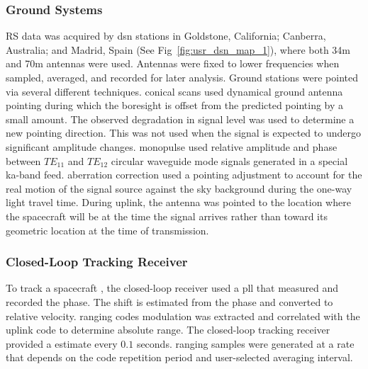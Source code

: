 \documentclass[crop=false,class=article,oneside]{standalone}
\begin{document}
        \subsubsection{\footnotesize{Ground Systems}}
            \label{subsubsec:usr_ground_sys}
            RS data was acquired by \gls{dsn} stations in
            Goldstone, California; Canberra, Australia;
            and Madrid, Spain
            (See Fig~\ref{fig:usr_dsn_map_1}),
            where both 34m and 70m antennas were used.
            Antennas were fixed to lower frequencies when
            sampled, averaged, and recorded for later
            analysis. Ground stations were pointed via
            several different techniques. \Glspl{conical scan}
            used dynamical ground antenna pointing during
            which the boresight is offset from the predicted
            pointing by a small amount. The observed
            degradation in signal level was used to determine
            a new pointing direction. This was not used when
            the signal is expected to undergo significant
            amplitude changes. \Gls{monopulse} used relative
            amplitude and phase between $TE_{11}$ and
            $TE_{12}$ circular \gls{waveguide} mode signals
            generated in a special \gls{ka-band} feed.
            \Gls{aberration correction} used a pointing
            adjustment to account for the real motion of
            the signal source against the sky background
            during the one-way light travel time. During
            \gls{uplink}, the antenna was pointed to the
            location where the spacecraft will be at the
            time the signal arrives rather than toward its
            geometric location at the time of transmission.
        \subsubsection{%
            \footnotesize{Closed-Loop Tracking Receiver}
        }
            \label{subsubsec:usr_closed_loop_track_rec}
            To track a spacecraft
            , the
            \gls{closed-loop} receiver used a \gls{pll}
            that measured and recorded the
             \gls{phase}.
            The  shift
            is estimated from the phase and converted to
            relative velocity. \Glspl{ranging code}
            \gls{modulation} was extracted and correlated
            with the \gls{uplink} code to determine
            \gls{absolute range}. The \gls{closed-loop}
            tracking receiver provided a
             estimate
            every $0.1$ seconds. \Glspl{ranging sample}
            were generated at a rate that depends on the
            code repetition period and user-selected
            averaging interval.
\end{document}
